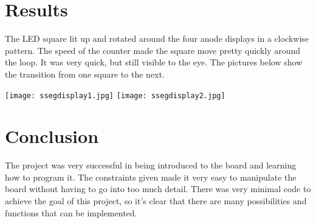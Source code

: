 \documentclass[11pt]{article}
\begin{document}
\section*{Results}
The LED square lit up and rotated around the four anode displays in a clockwise pattern. The speed of the counter made the square move pretty quickly around the loop. It was very quick, but still visible to the eye. The pictures below show the transition from one square to the next.

\texttt{[image: ssegdisplay1.jpg]}
\vspace{1cm}
\texttt{[image: ssegdisplay2.jpg]}

\section*{Conclusion}

The project was very successful in being introduced to the board and learning how to program it. The constraints given made it very easy to manipulate the board without having to go into too much detail. There was very minimal code to achieve the goal of this project, so it's clear that there are many possibilities and functions that can be implemented. 
\end{document}
